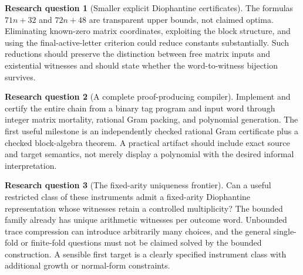 \documentclass[11pt,letterpaper]{article}
\numberwithin{equation}{section}
\theoremstyle{definition}
\newtheorem{question}{Research question}
\theoremstyle{remark}
\begin{document}
\begin{question}[Smaller explicit Diophantine certificates]\label{pqc:qm:q:smaller}
The formulas $71n+32$ and $72n+48$ are transparent upper bounds, not claimed optima. Eliminating known-zero matrix coordinates, exploiting the block structure, and using the final-active-letter criterion could reduce constants substantially. Such reductions should preserve the distinction between free matrix inputs and existential witnesses and should state whether the word-to-witness bijection survives.
\end{question}

\begin{question}[A complete proof-producing compiler]\label{pqc:qm:q:compiler}
Implement and certify the entire chain from a binary tag program and input word through integer matrix mortality, rational Gram packing, and polynomial generation. The first useful milestone is an independently checked rational Gram certificate plus a checked block-algebra theorem. A practical artifact should include exact source and target semantics, not merely display a polynomial with the desired informal interpretation.
\end{question}

\begin{question}[The fixed-arity uniqueness frontier]\label{pqc:qm:q:frontier}
Can a useful restricted class of these instruments admit a fixed-arity Diophantine representation whose witnesses retain a controlled multiplicity? The bounded family already has unique arithmetic witnesses per outcome word. Unbounded trace compression can introduce arbitrarily many choices, and the general single-fold or finite-fold questions must not be claimed solved by the bounded construction. A sensible first target is a clearly specified instrument class with additional growth or normal-form constraints.
\end{question}
\end{document}
